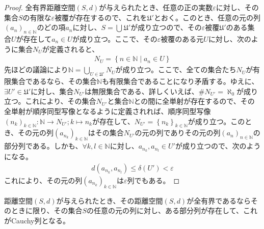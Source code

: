 \documentclass[dvipdfmx]{jsarticle}
\begin{document}
\begin{proof}
全有界距離空間$(S,d)$が与えられたとき、任意の正の実数$\varepsilon$に対し、その集合$S$の有限な$\varepsilon$被覆が存在するので、これを$\mathfrak{U}'$とおく。このとき、任意の元の列$\left( a_{n} \right)_{n \in \mathbb{N}}$のどの項$a_{n}$に対し、$S = \bigcup_{} \mathfrak{U}'$が成り立つので、その$\varepsilon$被覆$\mathfrak{U}'$のある集合$U$が存在して$a_{n} \in U$が成り立つ。ここで、その$\varepsilon$被覆のある元$U$に対し、次のように集合$N_{U}$が定義されると、
\begin{align*}
N_{U} = \left\{ n \in \mathbb{N} \middle| a_{n} \in U \right\}
\end{align*}
先ほどの議論により$\mathbb{N} = \bigcup_{U \in \mathfrak{U}'} N_{U}$が成り立つ。ここで、全ての集合たち$N_{U}$が有限集合であるなら、その集合$\mathbb{N}$も有限集合であることになり矛盾する。ゆえに、$\exists U' \in \mathfrak{U}'$に対し、集合$N_{U'}$は無限集合である、詳しくいえば、${\#}N_{U'} = \aleph_{0}$が成り立つ。これにより、その集合$N_{U'}$と集合$\mathbb{N}$との間に全単射が存在するので、その全単射が順序同型写像となるように定義されれば、順序同型写像$\left( n_{k} \right)_{k \in \mathbb{N}}:\mathbb{N} \rightarrow N_{U'};k \mapsto n_{k}$が存在して、$N_{U'} = \left\{ n_{k} \right\}_{k \in \mathbb{N}}$が成り立つ。このとき、その元の列$\left( a_{n_{k}} \right)_{k \in \mathbb{N}}$はその集合$N_{U'}$の元の列でありその元の列$\left( a_{n} \right)_{n \in \mathbb{N}}$の部分列である。しかも、$\forall k,l \in \mathbb{N}$に対し、$a_{n_{k}},a_{n_{l}} \in U'$が成り立つので、次のようになる。
\begin{align*}
d\left( a_{n_{k}},a_{n_{l}} \right) \leq \delta\left( U' \right) < \varepsilon
\end{align*}
これにより、その元の列$\left( a_{n_{k}} \right)_{k \in \mathbb{N}}$は$\varepsilon$列でもある。
\end{proof}
\begin{thm}\label{8.2.4.21}
距離空間$(S,d)$が与えられたとき、その距離空間$(S,d)$が全有界であるならそのときに限り、その集合$S$の任意の元の列に対し、ある部分列が存在して、これがCauchy列となる。
\end{thm}
\end{document}
